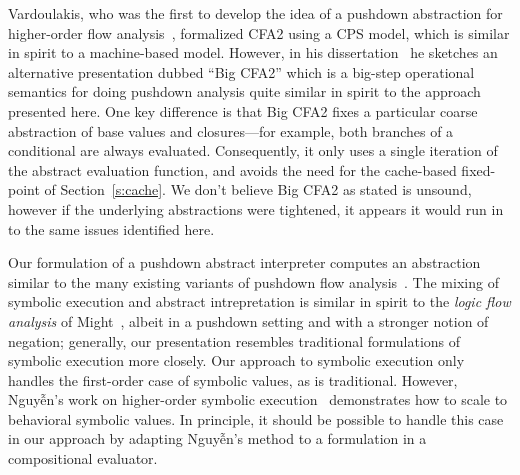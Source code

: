 Vardoulakis, who was the first to develop the idea of a pushdown abstraction
for higher-order flow analysis~\cite{dvanhorn:Vardoulakis2011CFA2}, formalized
CFA2 using a CPS model, which is similar in spirit to a machine-based model.
However, in his dissertation~\cite{local:vardoulakis-diss12} he sketches an
alternative presentation dubbed ``Big CFA2'' which is a big-step operational
semantics for doing pushdown analysis quite similar in spirit to the approach
presented here.  One key difference is that Big CFA2 fixes a particular coarse
abstraction of base values and closures---for example, both branches of a
conditional are always evaluated.  Consequently, it only uses a single
iteration of the abstract evaluation function, and avoids the need for the
cache-based fixed-point of Section~\ref{s:cache}.  We don't believe Big CFA2 as
stated is unsound, however if the underlying abstractions were tightened, it
appears it would run in to the same issues identified here.

Our formulation of a pushdown abstract interpreter computes an abstraction
similar to the many existing variants of pushdown flow analysis~\cite%
{dvanhorn:Vardoulakis2011CFA2%
,dvanhorn:Earl2010Pushdown%
,local:vardoulakis-diss12%
,dvanhorn:VanHorn2012Systematic%
,dvanhorn:Earl2012Introspective%
,dvanhorn:Johnson2014Abstracting%
,dvanhorn:Johnson2014Pushdown%
,local:p4f%
}.
The mixing of symbolic execution and abstract intrepretation is similar in
spirit to the \emph{logic flow analysis} of Might~\cite{local:might-popl07},
albeit in a pushdown setting and with a stronger notion of negation; generally,
our presentation resembles traditional formulations of symbolic execution more
closely.  Our approach to symbolic execution only handles the first-order case
of symbolic values, as is traditional.  However, Nguyễn's work on higher-order
symbolic execution~\cite{dvanhorn:Nguyen2015Relatively} demonstrates how to
scale to behavioral symbolic values.  In principle, it should be possible to
handle this case in our approach by adapting Nguyễn's method to a formulation
in a compositional evaluator.

